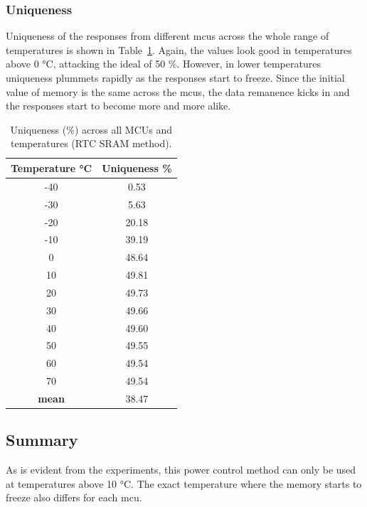 \subsubsection*{Uniqueness}

Uniqueness of the responses from different \glspl{mcu} across the whole range of temperatures is shown in Table~\ref{table:uniqueness_rtc_sram}. Again, the values look good in temperatures above 0 °C, attacking the ideal of 50 \%. However, in lower temperatures uniqueness plummets rapidly as the responses start to freeze. Since the initial value of memory is the same across the \glspl{mcu}, the data remanence kicks in and the responses start to become more and more alike.

\begin{table}[ht!]
    \centering
    \begin{tabular}{cc}
    \textbf{Temperature °C} & \textbf{Uniqueness \%} \\
    \toprule
    -40  &  0.53 \\
    -30  &  5.63 \\
    -20  & 20.18 \\
    -10  & 39.19 \\
    0    & 48.64 \\
    10   & 49.81 \\
    20   & 49.73 \\
    30   & 49.66 \\
    40   & 49.60 \\
    50   & 49.55 \\
    60   & 49.54 \\
    70   & 49.54 \\
    \textbf{mean} & 38.47 \\
    \bottomrule
    \end{tabular}
    \captionsetup{justification=centering,margin=0.5cm}
    \caption{Uniqueness (\%) across all MCUs and temperatures (RTC SRAM method).}
    \label{table:uniqueness_rtc_sram}
\end{table}

\subsection{Summary}
As is evident from the experiments, this power control method can only be used at temperatures above 10 °C. The exact temperature where the memory starts to freeze also differs for each \gls{mcu}.

